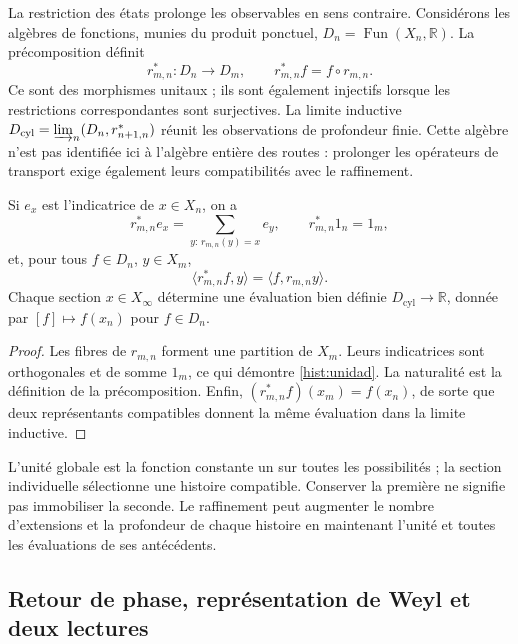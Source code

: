 La restriction des états prolonge les observables en sens contraire.
Considérons les algèbres de fonctions, munies du produit ponctuel,
\(D_n=\operatorname{Fun}(X_n,\mathbb R)\). La précomposition définit
\begin{equation}
 r_{m,n}^*:D_n\longrightarrow D_m,
 \qquad r_{m,n}^*f=f\circ r_{m,n}.
 \label{hist:precomposicion}
\end{equation}
Ce sont des morphismes unitaux ; ils sont également injectifs lorsque les restrictions
correspondantes sont surjectives. La limite inductive
\(D_{\mathrm{cyl}}=\varinjlim_n(D_n,r_{n+1,n}^*)\) réunit les
observations de profondeur finie. Cette algèbre n’est pas identifiée ici
à l’algèbre entière des routes : prolonger les opérateurs de transport exige
également leurs compatibilités avec le raffinement.

\begin{lemma}
Si \(e_x\) est l’indicatrice de \(x\in X_n\), on a
\begin{equation}
 r_{m,n}^*e_x=\sum_{y:\,r_{m,n}(y)=x}e_y,
 \qquad r_{m,n}^*1_n=1_m,
 \label{hist:unidad}
\end{equation}
et, pour tous \(f\in D_n\), \(y\in X_m\),
\[
 \langle r_{m,n}^*f,y\rangle=\langle f,r_{m,n}y\rangle.
\]
Chaque section \(x\in X_\infty\) détermine une évaluation bien définie
\(D_{\mathrm{cyl}}\to\mathbb R\), donnée par \([f]\mapsto f(x_n)\)
pour \(f\in D_n\).
\end{lemma}
\begin{proof}
Les fibres de \(r_{m,n}\) forment une partition de \(X_m\). Leurs
indicatrices sont orthogonales et de somme \(1_m\), ce qui démontre
\eqref{hist:unidad}. La naturalité est la définition de la précomposition.
Enfin, \((r_{m,n}^*f)(x_m)=f(x_n)\), de sorte que deux représentants
compatibles donnent la même évaluation dans la limite inductive.
\end{proof}

L’unité globale est la fonction constante un sur toutes les possibilités ;
la section individuelle sélectionne une histoire compatible. Conserver la
première ne signifie pas immobiliser la seconde. Le raffinement peut augmenter
le nombre d’extensions et la profondeur de chaque histoire en maintenant
l’unité et toutes les évaluations de ses antécédents.

\subsection{Retour de phase, représentation de Weyl et deux lectures}
\label{hist:puente-lecturas}

